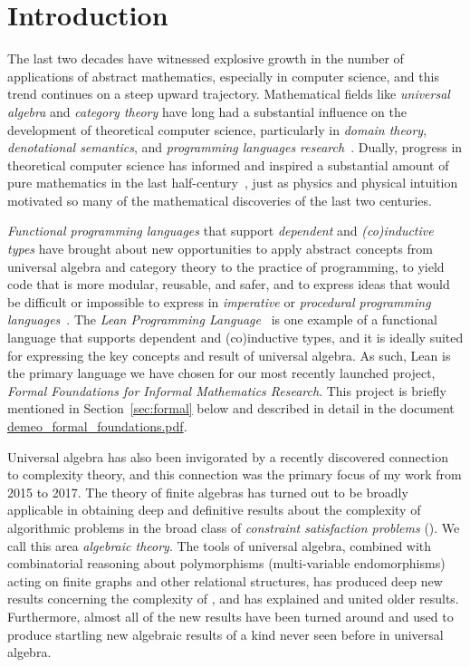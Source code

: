 \vskip5mm

\section{Introduction}
The last two decades have witnessed explosive growth in the number of applications of abstract mathematics, especially in computer science, and this trend continues on a steep upward trajectory. Mathematical fields like \emph{universal algebra} and \emph{category theory} have long had a substantial influence on the development of theoretical computer science, particularly in \emph{domain theory}, \emph{denotational semantics}, and \emph{programming languages research}~\cite{MR2328298,MR1249550}. Dually, progress in theoretical computer science has informed and inspired a substantial amount of pure mathematics in the last half-century~\cite{MR3662915,MR3725758,MR2765040,MR3233442,MR1321662,MR1249550}, just as physics and physical intuition motivated so many of the mathematical discoveries of the last two centuries.  

\emph{Functional programming languages} that support \emph{dependent} and \emph{(co)inductive types} have brought about new opportunities to apply abstract concepts from universal algebra and category theory to the practice of programming, to yield code that is more modular, reusable, and safer, and to express ideas that would be difficult or impossible to express in \emph{imperative} or \emph{procedural programming languages}~\cite[Chs. 5 \& 10]{baueroplss:2018,hughes:1989,chiusano:2014}. 
The \emph{Lean Programming Language}~\cite{lean} is one example of a functional language that supports dependent and (co)inductive types, and it is ideally suited for expressing the key concepts and result of universal algebra.  As such, Lean is the primary language we have chosen for our most recently launched project, \emph{Formal Foundations for Informal Mathematics Research}.  This project is briefly mentioned in Section~\ref{sec:formal} below and described in detail in the document 
\href{https://github.com/williamdemeo/job-app/blob/master/research/demeo_formal_foundations.pdf}{demeo\_formal\_foundations.pdf}.

Universal algebra has also been invigorated by a recently discovered connection to complexity theory, and this connection was the primary focus of my work from 2015 to 2017. 
The theory of finite algebras has turned out to be broadly applicable in obtaining deep and definitive results about the complexity of algorithmic problems in the broad class of  {\it constraint satisfaction problems} (\csps).   We call this area {\it algebraic \csp theory}.
The tools of universal algebra, combined with combinatorial reasoning about polymorphisms (multi-variable endomorphisms) acting on finite graphs and other relational structures, has produced deep new results concerning the complexity of \csps, and has explained and united older results. Furthermore, almost all of the new results have been turned around and used to produce
startling new algebraic results of a kind never seen before in universal algebra.

